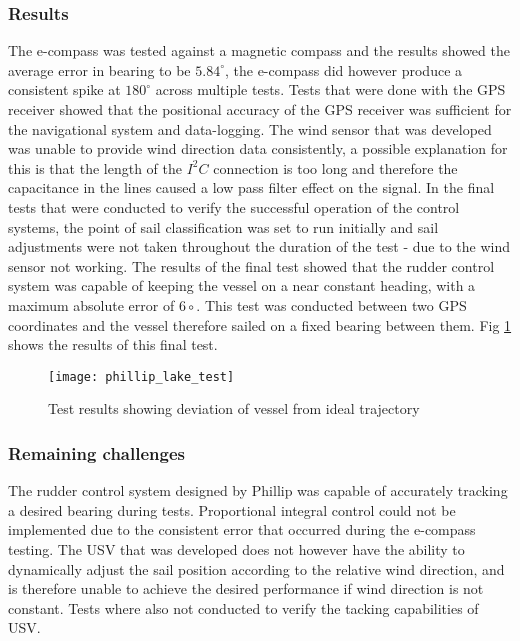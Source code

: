 \subsubsection{Results}
The e-compass was tested against a magnetic compass and the results showed the average error in bearing to be $5.84^{\circ}$, the e-compass did however produce a consistent spike at $180^{\circ}$ across
multiple tests. Tests that were done with the GPS receiver showed that the positional accuracy of the GPS receiver was sufficient for the navigational system and data-logging. The wind sensor that
was developed was unable to provide wind direction data consistently, a possible explanation for this is that the length of the $I^{2}C$ connection is too long and therefore the capacitance in the lines caused 
a low pass filter effect on the signal. In the final tests that were conducted to verify the successful operation of the control systems, the point of sail classification was set to run initially and sail adjustments were not taken 
throughout the duration of the test - due to the wind sensor not working. The results of the final test showed that the rudder control system was capable of keeping the vessel on a near constant 
heading, with a maximum absolute error of $6\circ$. This test was conducted between two GPS coordinates and the vessel therefore sailed on a fixed bearing between them. Fig \ref{fig:phillip_lake_test} shows
the results of this final test.

\begin{figure}[!h]
    \centering
    \texttt{[image: phillip\_lake\_test]}
    \caption[Test results from lake test]{Test results showing deviation of vessel from ideal trajectory \cite{Phillip}}
    \label{fig:phillip_lake_test}
\end{figure}

\subsubsection{Remaining challenges}
The rudder control system designed by Phillip was capable of accurately tracking a desired bearing during tests. Proportional integral control could not be implemented due to the consistent error that occurred during 
the e-compass testing. The USV that was developed does not however have the ability to dynamically adjust the sail position according to the relative wind direction, and is therefore unable to achieve the desired 
performance if wind direction is not constant. Tests where also not conducted to verify the tacking capabilities of USV.

